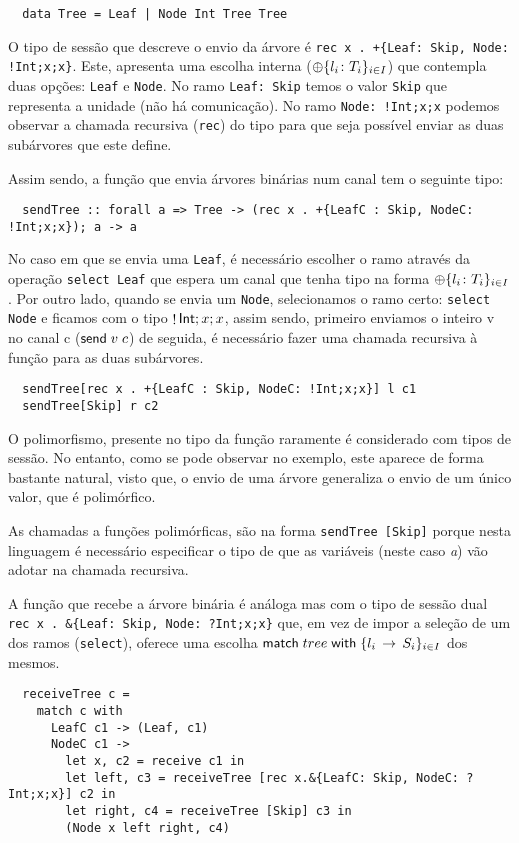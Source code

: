 \begin{lstlisting}
  data Tree = Leaf | Node Int Tree Tree
\end{lstlisting}

O tipo de sessão que descreve o envio da árvore é \lstinline"rec x . +{Leaf: Skip, Node: !Int;x;x}". Este, apresenta uma escolha interna ($\oplus\{l_i\colon T_i\}_{i\in I}$) que contempla duas opções: \lstinline"Leaf" e \lstinline"Node". No ramo \lstinline"Leaf: Skip" temos o valor \lstinline"Skip" que representa a unidade (não há comunicação). No ramo \lstinline"Node: !Int;x;x" podemos observar a chamada recursiva (\lstinline"rec") do tipo para que seja possível enviar as duas subárvores que este define.

Assim sendo, a função que envia árvores binárias num canal tem o seguinte tipo:

\begin{lstlisting}
  sendTree :: forall a => Tree -> (rec x . +{LeafC : Skip, NodeC: !Int;x;x}); a -> a
\end{lstlisting}


No caso em que se envia uma \lstinline"Leaf", é necessário escolher o ramo através da operação \lstinline"select Leaf" que espera um canal que tenha tipo na forma $\oplus\{l_i\colon T_i\}_{i\in I}$.
Por outro lado, quando se envia um \lstinline"Node", selecionamos o ramo certo: \lstinline"select Node" e ficamos com o tipo $\mathop!\mathsf{Int};x;x$, assim sendo, primeiro enviamos o inteiro v no canal c ($\mathsf{send}\;v\; c$) de seguida, é necessário fazer uma chamada recursiva à função para as duas subárvores.

\begin{lstlisting}
  sendTree[rec x . +{LeafC : Skip, NodeC: !Int;x;x}] l c1
  sendTree[Skip] r c2
\end{lstlisting}

O polimorfismo, presente no tipo da função raramente é considerado com tipos de sessão. No entanto, como se pode observar no exemplo, este aparece de forma bastante natural, visto que, o envio de uma árvore generaliza o envio de um único valor, que é polimórfico.

As chamadas a funções polimórficas, são na forma \lstinline"sendTree [Skip]" porque nesta linguagem é necessário especificar o tipo de que as variáveis (neste caso \textit{a}) vão adotar na chamada recursiva.

A função que recebe a árvore binária é análoga mas com o tipo de sessão dual \lstinline"rec x . &{Leaf: Skip, Node: ?Int;x;x}" que, em vez de impor a seleção de um dos ramos (\lstinline"select"), oferece uma escolha $\mathsf{match}\;tree\;\mathsf{with}\;\{l_i\,\to\,S_i\}_{i\in I}$ dos mesmos.
\begin{lstlisting}  
  receiveTree c =
    match c with
      LeafC c1 -> (Leaf, c1)
      NodeC c1 ->
        let x, c2 = receive c1 in
        let left, c3 = receiveTree [rec x.&{LeafC: Skip, NodeC: ?Int;x;x}] c2 in
        let right, c4 = receiveTree [Skip] c3 in
        (Node x left right, c4)
\end{lstlisting}



